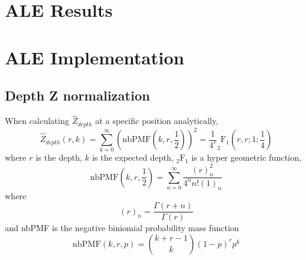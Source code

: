 \documentclass[phd,tocprelim]{cornell}
\begin{document}


\chapter{ALE Results} %
\label{cha:ALE Results}


\chapter{ALE Implementation} %
\label{cha:ALE Implementation}

\section{Depth Z normalization} %
\label{sec:Depth Z normalization}

When calculating $\hat{Z}_{depth}$ at a specific position analytically,
\begin{equation}
    \hat{Z}_{depth}(r,k) = \sum_{k=0}^{\infty} \left(\mbox{nbPMF}\left(k,r,\frac{1}{2}\right)\right)^{2} = \frac{1}{4^{r}}_{2}\mbox{F}_{1}\left(r,r;1;\frac{1}{4}\right)
\end{equation}
where $r$ is the depth, $k$ is the expected depth, $_{2}\mbox{F}_{1}$ is a hyper geometric function,
\begin{equation}
    \mbox{nbPMF}\left(k,r,\frac{1}{2}\right) = \sum_{n=0}^{\infty} \frac{(r)^{2}_{n}}{4^{n}n!(1)_{n}}
\end{equation}
where
\begin{equation}
    (r)_{n} = \frac{\Gamma(r+n)}{\Gamma(r)}    
\end{equation}
and nbPMF is the negative biniomial probability mass function
\begin{equation}
    \mbox{nbPMF}\left(k,r,p\right) = {k+r-1 \choose k} (1-p)^{r}p^{k}
\end{equation}
\end{document}
